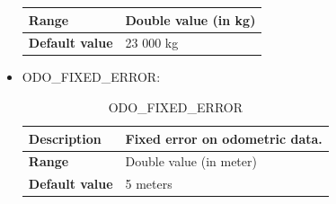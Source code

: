 \begin{itemize}
\begin{longtable}{|l|l|}
				\hline

					\begin{minipage}[t]{0.22\linewidth} \textbf{Range}	\end{minipage}
				&	\begin{minipage}[t]{0.78\linewidth} Double value (in kg) \end{minipage} \\

				\hline

					\begin{minipage}[t]{0.22\linewidth} \textbf{Default value}	\end{minipage}
				&	\begin{minipage}[t]{0.78\linewidth} 23 000 kg \end{minipage} \\

				\hline

			\end{longtable}

		\item ODO\_FIXED\_ERROR:

			\begin{longtable}{|l|l|}
				\caption{ODO\_FIXED\_ERROR}\\
				\hline

					\begin{minipage}[t]{0.22\linewidth} \textbf{Description}	\end{minipage}
				&	\begin{minipage}[t]{0.78\linewidth} Fixed error on odometric data. \end{minipage} \\

				\hline

					\begin{minipage}[t]{0.22\linewidth} \textbf{Range}	\end{minipage}
				&	\begin{minipage}[t]{0.78\linewidth} Double value (in meter) \end{minipage} \\

				\hline

					\begin{minipage}[t]{0.22\linewidth} \textbf{Default value}	\end{minipage}
				&	\begin{minipage}[t]{0.78\linewidth} 5 meters \end{minipage} \\


\end{longtable}
\end{itemize}
